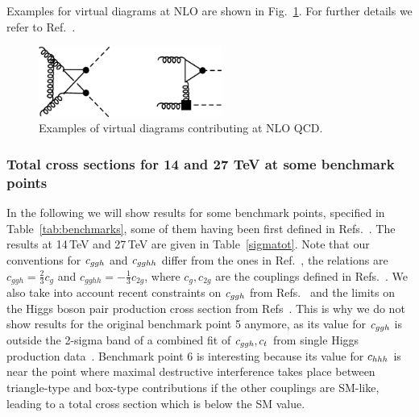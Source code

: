 Examples for virtual diagrams at NLO are shown in
Fig.~\ref{fig:virt_examples}.
For further details we refer to Ref.~\cite{Buchalla:2018yce}.
\begin{figure}[htb]
\begin{center}
\includegraphics[width=6cm]{section3/plots/hpnloyr1.pdf}
\end{center}
\caption{Examples of virtual diagrams contributing at NLO QCD.}
\label{fig:virt_examples}
\end{figure}


\subsubsection{Total cross sections for 14 and 27 TeV at some benchmark points}

In the following we will show results for some benchmark points, specified in Table~\ref{tab:benchmarks}, 
some of them having been first defined in Refs.~\cite{Carvalho:2015ttv}.
The results at 14\,TeV and 27\,TeV are given in Table~\ref{sigmatot}.
Note that our conventions for $c_{ggh}$ and $c_{gghh}$ differ from the ones in
Ref.~\cite{Carvalho:2015ttv,Carvalho:2016rys}, the relations are $c_{ggh}= \frac{2}{3}c_g $
and $c_{gghh}=-\frac{1}{3}c_{2g}$, where $c_g,c_{2g}$ are the
couplings defined in Refs.~\cite{Carvalho:2015ttv,Carvalho:2016rys}.
We also take into account recent constraints on $c_{ggh}$ from
Refs.~\cite{CMS-PAS-HIG-17-031,deBlas:2018tjm}
and the  limits on the Higgs boson pair production cross section
from Refs~\cite{CMS-PAS-HIG-17-030,ATLAS-CONF-2018-043}.
This is why we do not show results for the original benchmark point 5
anymore, as its value for $c_{ggh}$ is outside the 2-sigma band of a
combined fit of $c_{ggh},c_{t}$ from single Higgs production
data~\cite{CMS-PAS-HIG-17-031,deBlas:2018tjm}.
Benchmark point 6 is interesting because its value for $c_{hhh}$ is near
the point where maximal destructive interference takes place between
triangle-type and box-type contributions if the other couplings are SM-like, leading to a total cross
section which is below the SM value.

